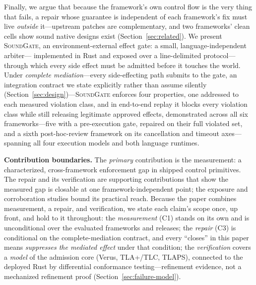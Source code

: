 \documentclass[10pt,journal,compsoc]{IEEEtran}
\newcommand{\sys}{\textsc{SoundGate}}
\begin{document}
Finally, we argue that because the framework's own control flow is the very thing
that fails, a repair whose guarantee is independent of each framework's fix
must live \emph{outside} it---upstream patches are complementary, and two
frameworks' clean cells show sound native designs exist
(Section~\ref{sec:related}). We present \sys{}, an
environment-external effect gate: a small, language-independent arbiter---%
implemented in Rust and exposed over a line-delimited protocol---through which
every side effect must be admitted before it touches the world. Under
\emph{complete mediation}---every side-effecting path submits to the gate, an
integration contract we state explicitly rather than assume silently
(Section~\ref{sec:design})---\sys{} enforces
four properties, one addressed to each measured violation class, and in
end-to-end replay it blocks every violation class while still
releasing legitimate approved effects, demonstrated across all six
frameworks---five with a pre-execution gate, repaired on their full violated
set, and a sixth post-hoc-review framework on its cancellation and timeout
axes---spanning all four execution models and both language runtimes.

\noindent\textbf{Contribution boundaries.} The \emph{primary} contribution is
the measurement: a characterized, cross-framework enforcement gap in shipped
control primitives. The repair and its verification are supporting
contributions that show the measured gap is closable at one
framework-independent point; the exposure and corroboration studies bound its
practical reach. Because the paper combines
measurement, a repair, and verification, we state each claim's scope once,
up front, and hold to it throughout: the \emph{measurement} (C1) stands on
its own and is unconditional over the evaluated frameworks and releases; the
\emph{repair} (C3) is conditional on the complete-mediation contract, and
every ``closes'' in this paper means \emph{suppresses the mediated effect}
under that condition; the \emph{verification} covers a \emph{model} of the
admission core (Verus, TLA+/TLC, TLAPS), connected to the deployed Rust by
differential conformance testing---refinement evidence, not a mechanized
refinement proof (Section~\ref{sec:failure-model}).
\end{document}

